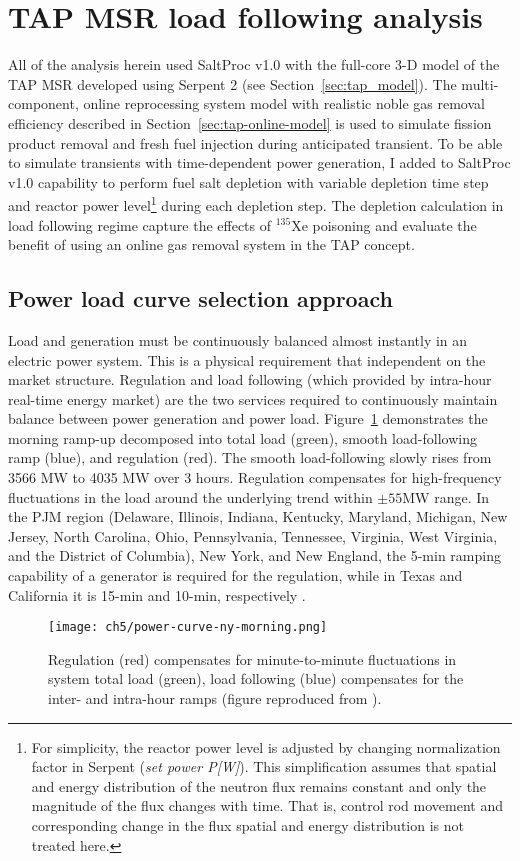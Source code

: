 \section{TAP MSR load following analysis}
All of the analysis herein used SaltProc v1.0 with the full-core 3-D model of 
the \gls{TAP} \gls{MSR} developed using Serpent 2 (see 
Section~\ref{sec:tap_model}). The multi-component, online reprocessing system 
model with realistic noble gas removal efficiency described in 
Section~\ref{sec:tap-online-model} is used to simulate fission product removal 
and fresh fuel injection during anticipated transient. To be able to simulate 
transients with time-dependent power generation, I added to SaltProc v1.0 
capability to perform fuel salt depletion with variable depletion time step 
and reactor power level\footnote{For simplicity, the reactor power level is 
adjusted by changing normalization factor in Serpent (\emph{set power P[W]}). 
This simplification assumes that spatial and energy distribution of the 
neutron flux remains constant and only the magnitude of the flux changes with 
time. That is, control rod movement and corresponding change in the flux 
spatial and energy distribution is not treated here.} during each depletion 
step. The depletion calculation in load following regime capture the effects 
of $^{135}$Xe poisoning and evaluate the benefit of using an online gas 
removal system in the \gls{TAP} concept.

\subsection{Power load curve selection approach}
Load and generation must be continuously balanced almost instantly  in an 
electric power system. This is a physical requirement that independent on the 
market structure. Regulation and load following (which provided by intra-hour 
real-time energy market) are the two services required to continuously 
maintain balance between power generation and power load. 
Figure~\ref*{fig:power-curve-ny} demonstrates the morning ramp-up decomposed 
into total load (green), smooth load-following ramp (blue), and regulation 
(red). The smooth load-following slowly rises from 3566 MW to 4035 MW over 3 
hours. Regulation compensates for high-frequency fluctuations in the load 
around the underlying trend within $\pm55$MW range. In the PJM region 
(Delaware, Illinois, Indiana, Kentucky, Maryland, Michigan, New Jersey, North 
Carolina, Ohio, Pennsylvania, Tennessee, Virginia, West Virginia, and the 
District of Columbia), New York, and New England, the 5-min ramping capability 
of a generator is required for the regulation, while in Texas and California 
it is 15-min and 10-min, respectively \cite{kirby_method_2005}.
\begin{figure}[htp!] %
	\centering
	\texttt{[image: ch5/power-curve-ny-morning.png]}
	\caption{Regulation (red) compensates for minute-to-minute fluctuations in 
	system total load (green), load following (blue) compensates for the 
	inter- and 
	intra-hour ramps (figure reproduced from \cite{kirby_method_2005}).}
	\label{fig:power-curve-ny}
\end{figure}

